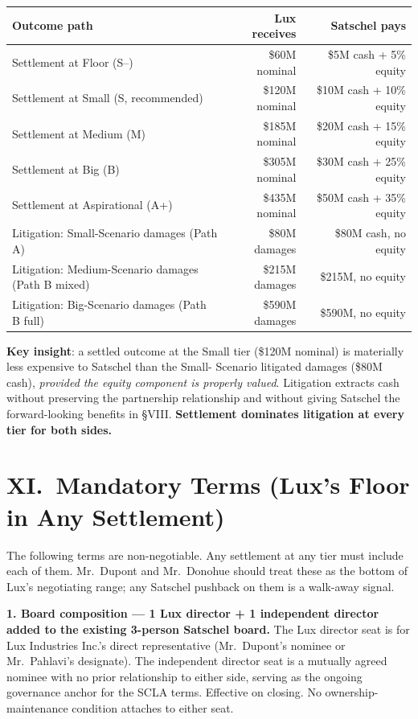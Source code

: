 \documentclass[11pt,letterpaper]{article}
\begin{document}
\begin{center}
\begin{tabular}{lrr}
\toprule
\textbf{Outcome path} & \textbf{Lux receives} & \textbf{Satschel pays} \\
\midrule
Settlement at Floor (S--) & \$60M nominal & \$5M cash + 5\% equity \\
Settlement at Small (S, recommended) & \$120M nominal & \$10M cash + 10\% equity \\
Settlement at Medium (M) & \$185M nominal & \$20M cash + 15\% equity \\
Settlement at Big (B) & \$305M nominal & \$30M cash + 25\% equity \\
Settlement at Aspirational (A+) & \$435M nominal & \$50M cash + 35\% equity \\
Litigation: Small-Scenario damages (Path A) & \$80M damages & \$80M cash, no equity \\
Litigation: Medium-Scenario damages (Path B mixed) & \$215M damages & \$215M, no equity \\
Litigation: Big-Scenario damages (Path B full) & \$590M damages & \$590M, no equity \\
\bottomrule
\end{tabular}
\end{center}

\textbf{Key insight}: a settled outcome at the Small tier (\$120M
nominal) is materially less expensive to Satschel than the Small-
Scenario litigated damages (\$80M cash), \textit{provided the equity
component is properly valued}. Litigation extracts cash without
preserving the partnership relationship and without giving Satschel
the forward-looking benefits in \S VIII. \textbf{Settlement
dominates litigation at every tier for both sides.}

\section*{XI.\ Mandatory Terms (Lux's Floor in Any Settlement)}

The following terms are non-negotiable. Any settlement at any tier
must include each of them. Mr.\ Dupont and Mr.\ Donohue should treat
these as the bottom of Lux's negotiating range; any Satschel pushback
on them is a walk-away signal.

\textbf{1. Board composition --- 1 Lux director + 1 independent
director added to the existing 3-person Satschel board.} The Lux
director seat is for Lux Industries Inc.'s direct representative
(Mr.\ Dupont's nominee or Mr.\ Pahlavi's designate). The independent
director seat is a mutually agreed nominee with no prior relationship
to either side, serving as the ongoing governance anchor for the
SCLA terms. Effective on closing. No ownership-maintenance condition
attaches to either seat.
\end{document}
